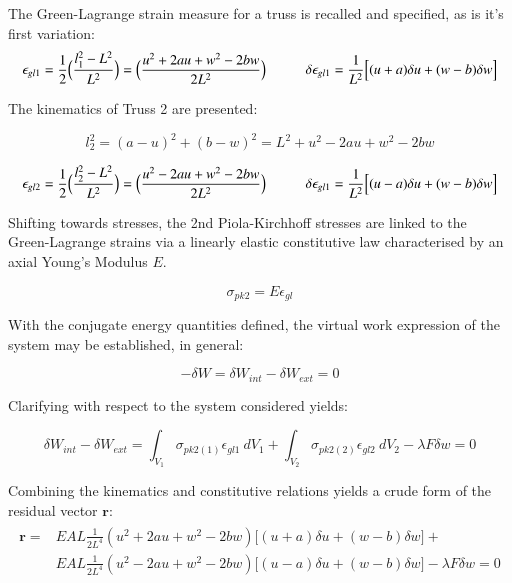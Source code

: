 The Green-Lagrange strain measure for a truss is recalled and specified, as is it's first variation:
\begin{equation} 
\epsilon_{gl1} = \frac{1}{2}
\Big(\frac{l_1^2-L^2}{L^2}\Big)
=
\Big(\frac{u^2 + 2au +w^2 -2bw}{2L^2}\Big)
\hspace{10mm}
\delta\epsilon_{gl1} = 
\frac{1}{L^2}
\Big[
(u+a)\delta u
+
(w-b)\delta w
\Big]
\label{eqapp0_2}
\end{equation}

The kinematics of Truss 2 are presented:

\begin{equation} 
l_2^2 = (a-u)^2 + (b-w)^2 = L^2 + u^2 - 2au +w^2 -2bw
\label{eqapp0_2_1}
\end{equation}

\begin{equation} 
\epsilon_{gl2} = \frac{1}{2}
\Big(\frac{l_2^2-L^2}{L^2}\Big)
=
\Big(\frac{u^2 - 2au +w^2 -2bw}{2L^2}\Big)
\hspace{10mm}
\delta\epsilon_{gl1} = 
\frac{1}{L^2}
\Big[
(u-a)\delta u
+
(w-b)\delta w
\Big]
\label{eqapp0_2_2}
\end{equation}

Shifting towards stresses, the 2nd Piola-Kirchhoff stresses are linked to the Green-Lagrange strains via a linearly elastic constitutive law characterised by an axial Young's Modulus $E$.

\begin{equation} 
\sigma_{pk2} = E \epsilon_{gl}
\label{eqapp0_3}
\end{equation}

With the conjugate energy quantities defined, the virtual work expression of the system may be established, in general:

\begin{equation} 
-\delta W = \delta W_{int} - \delta W_{ext} = 0
\label{eqapp0_4}
\end{equation}

Clarifying with respect to the system considered yields:

\begin{equation} 
\delta W_{int} - \delta W_{ext} = 
\int_{V_1} \sigma_{pk2(1)} \epsilon_{gl1}
\ dV_1
+
\int_{V_2} \sigma_{pk2(2)} \epsilon_{gl2}
\ dV_2
- \lambda F \delta w = 0
\label{eqapp0_5}
\end{equation}

Combining the kinematics and constitutive relations yields a crude form of the residual vector $\mathbf{r}$:
\begin{gather} 
	\begin{aligned}
		\mathbf{r} = 
		&EAL
		\frac{1}{2L^4}
		(u^2 + 2au +w^2 -2bw)
		\Big[
		(u+a)\delta u
		+
		(w-b)\delta w
		\Big] +
		\\
		&EAL
		\frac{1}{2L^4}
		(u^2 - 2au +w^2 -2bw)
		\Big[
		(u-a)\delta u
		+
		(w-b)\delta w
		\Big] 
		- \lambda F \delta w = 0
		\label{eqapp0_6_0}
	\end{aligned}
\end{gather}

